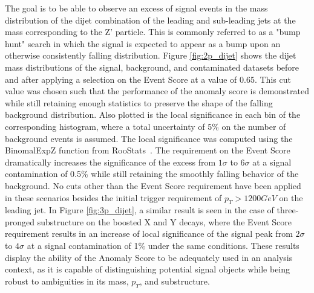 \documentclass[12pt, a4paper]{article}
\begin{document}
The goal is to be able to observe an excess of signal events in the mass distribution of the dijet combination of the leading and sub-leading jets at the mass corresponding to the Z' particle. This is commonly referred to as a "bump hunt" search in which the signal is expected to appear as a bump upon an otherwise consistently falling distribution. Figure \ref{fig:2p_dijet} shows the dijet mass distributions of the signal, background, and contaminated datasets before and after applying a selection on the Event Score at a value of 0.65. This cut value was chosen such that the performance of the anomaly score is demonstrated while still retaining enough statistics to preserve the shape of the falling background distribution. Also plotted is the local significance in each bin of the corresponding histogram, where a total uncertainty of 5\% on the number of background events is assumed. The local significance was computed using the {\sc BinomalExpZ} function from {\sc RooStats}~\cite{moneta2011roostats}. The requirement on the Event Score dramatically increases the significance of the excess from $1\sigma$ to $6\sigma$ at a signal contamination of 0.5\% while still retaining the smoothly falling behavior of the background. No cuts other than the Event Score requirement have been applied in these scenarios besides the initial trigger requirement of $p_{T} > 1200GeV$ on the leading jet. In Figure \ref{fig:3p_dijet}, a similar result is seen in the case of three-pronged substructure on the boosted X and Y decays, where the Event Score requirement results in an increase of local significance of the signal peak from $2\sigma$ to $4\sigma$ at a signal contamination of 1\% under the same conditions. These results display the ability of the Anomaly Score to be adequately used in an analysis context, as it is capable of distinguishing potential signal objects while being robust to ambiguities in its mass, $p_{T}$, and substructure.
\end{document}
